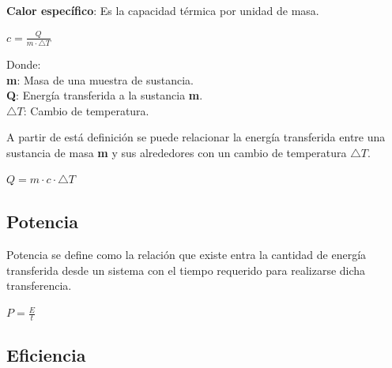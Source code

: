 \documentclass[]{article}
\begin{document}
\begin{flushleft}
	\textbf{Calor específico}: Es la capacidad térmica por unidad de masa.
	\begin{center}
		$c = \frac{Q}{m \cdot \bigtriangleup T}$
	\end{center}
	
	\begin{flushleft}
		Donde: \\
		\textbf{m}: Masa de una muestra de sustancia. \\
		\textbf{Q}: Energía transferida a la sustancia \textbf{m}. \\
		\textbf{$\bigtriangleup T$}: Cambio de temperatura. \\
	\end{flushleft}
	
	\begin{flushleft}
		A partir de está definición se puede relacionar la energía transferida entre una sustancia de masa \textbf{m} y sus alrededores con un cambio de temperatura $\bigtriangleup T$.
		
		\begin{center}
			$Q = m \cdot c \cdot \bigtriangleup T$
		\end{center}
	\end{flushleft}
\end{flushleft}

\subsection{Potencia}
Potencia se define como la relación que existe entra la cantidad de energía transferida desde un sistema con el tiempo requerido para realizarse dicha transferencia.

\begin{center}
	$P = \frac{E}{t}$
\end{center}
\subsection{Eficiencia}
\end{document}
